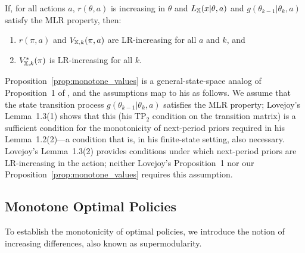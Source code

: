 \begin{proposition}\label{prop:monotone_values}
If, for all actions $a$, $r(\theta, a)$ is increasing in $\theta$ and
$L_{\mathbb{X}}(x|\theta,a)$ and $g(\theta_{k-1}|\theta_k,a)$ satisfy the MLR
property, then:
\begin{enumerate}
\item $r(\pi,a)$ and $V_{{\mathbb{X}},k}(\pi,a)$ are LR-increasing for all $a$
  and $k$, and
\item $V_{{\mathbb{X}},k}^*(\pi)$ is LR-increasing for all $k$.
\end{enumerate}
\end{proposition}

\begin{remark}\label{rem:lovejoy}
Proposition~\ref{prop:monotone_values} is a general-state-space analog
of Proposition~1 of \citet{lovejoy1987some}, and the assumptions map
to his as follows. We assume that the state transition process
$g(\theta_{k-1}|\theta_k,a)$ satisfies the MLR property; Lovejoy's
Lemma~1.3(1) shows that this (his TP$_2$ condition on the transition
matrix) is a sufficient condition for the monotonicity of next-period
priors required in his Lemma~1.2(2)---a condition that is, in his
finite-state setting, also necessary. Lovejoy's Lemma~1.3(2) provides
conditions under which next-period priors are LR-increasing in the
action; neither Lovejoy's Proposition~1 nor our
Proposition~\ref{prop:monotone_values} requires this assumption.
\end{remark}

\subsection{Monotone Optimal Policies}\label{sec:policies}

To establish the monotonicity of optimal policies, we introduce the
notion of increasing differences, also known as supermodularity.

